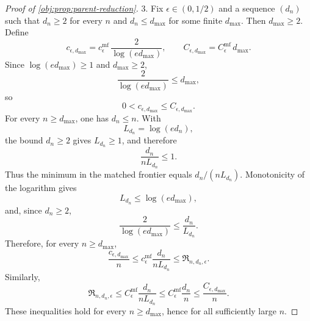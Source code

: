\documentclass[11pt]{article}
\begin{document}
\begin{proof}[Proof of \cref{obj:prop:parent-reduction}]
3. Fix \(\epsilon\in(0,1/2)\) and a sequence \((d_n)\) such that \(d_n\ge2\) for every \(n\) and
\(d_n\le d_{\max}\) for some finite \(d_{\max}\). Then \(d_{\max}\ge2\). Define
\[
c_{\epsilon,d_{\max}}
=
c_\epsilon^{\mathrm{mf}}\,\frac{2}{\log(ed_{\max})},
\qquad
C_{\epsilon,d_{\max}}
=
C_\epsilon^{\mathrm{mf}}\,d_{\max}.
\]
Since \(\log(ed_{\max})\ge1\) and \(d_{\max}\ge2\),
\[
\frac{2}{\log(ed_{\max})}\le d_{\max},
\]
so
\[
0<c_{\epsilon,d_{\max}}\le C_{\epsilon,d_{\max}}.
\]
For every \(n\ge d_{\max}\), one has \(d_n\le n\). With
\[
L_{d_n}=\log(ed_n),
\]
the bound \(d_n\ge2\) gives \(L_{d_n}\ge1\), and therefore
\[
\frac{d_n}{nL_{d_n}}\le1.
\]
Thus the minimum in the matched frontier equals \(d_n/(nL_{d_n})\). Monotonicity of the logarithm gives
\[
L_{d_n}\le \log(ed_{\max}),
\]
and, since \(d_n\ge2\),
\[
\frac{2}{\log(ed_{\max})}
\le
\frac{d_n}{L_{d_n}}.
\]
Therefore, for every \(n\ge d_{\max}\),
\[
\frac{c_{\epsilon,d_{\max}}}{n}
\le
c_\epsilon^{\mathrm{mf}}\frac{d_n}{nL_{d_n}}
\le
\mathfrak R_{n,d_n,\epsilon}.
\]
Similarly,
\[
\mathfrak R_{n,d_n,\epsilon}
\le
C_\epsilon^{\mathrm{mf}}\frac{d_n}{nL_{d_n}}
\le
C_\epsilon^{\mathrm{mf}}\frac{d_n}{n}
\le
\frac{C_{\epsilon,d_{\max}}}{n}.
\]
These inequalities hold for every \(n\ge d_{\max}\), hence for all sufficiently large \(n\). %
\end{proof}




\end{document}
